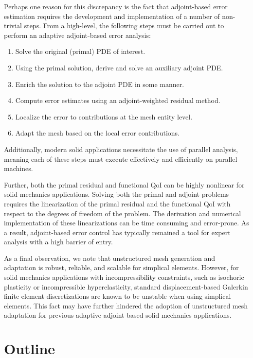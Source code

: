 Perhaps one reason for this discrepancy is the fact that adjoint-based error
estimation requires the development and implementation of a number of
non-trivial steps. From a high-level, the following steps must be carried out
to perform an adaptive adjoint-based error analysis:
%
\begin{enumerate}
\item Solve the original (primal) PDE of interest.
\item Using the primal solution, derive and solve an auxiliary adjoint PDE.
\item Enrich the solution to the adjoint PDE in some manner.
\item Compute error estimates using an adjoint-weighted residual method.
\item Localize the error to contributions at the mesh entity level.
\item Adapt the mesh based on the local error contributions.
\end{enumerate}
%
Additionally, modern solid applications necessitate the use of parallel
analysis, meaning each of these steps must execute effectively and
efficiently on parallel machines.

Further, both the primal residual and functional QoI can be highly nonlinear
for solid mechanics applications. Solving both the primal and adjoint problems
requires the linearization of the primal residual and the functional QoI
with respect to the degrees of freedom of the problem. The derivation and
numerical implementation of these linearizations can be time consuming and
error-prone. As a result, adjoint-based error control has typically remained
a tool for expert analysis with a high barrier of entry.

As a final observation, we note that unstructured mesh generation and
adaptation is robust, reliable, and scalable for simplical elements. However,
for solid mechanics applications with incompressibility constraints, such as
isochoric plasticity or incompressible hyperelasticity, standard
displacement-based Galerkin finite element discretizations are known to be
unstable when using simplical elements. This fact may have further hindered
the adoption of unstructured mesh adaptation for previous adaptive
adjoint-based solid mechanics applications.

\section{Outline}

